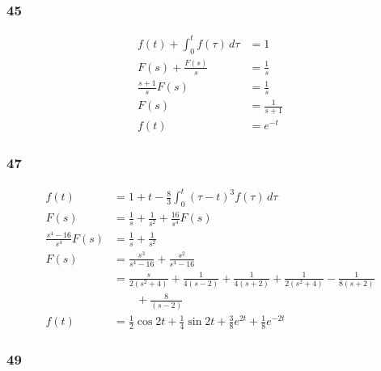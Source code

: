 \documentclass{article}
\begin{document}
\subsubsection{45}

\begin{align*}
  f(t) + \int_0^t f(\tau) \,d\tau & = 1               \\
  F(s) + \frac{F(s)}{s}           & = \frac{1}{s}     \\
  \frac{s + 1}{s} F(s)            & = \frac{1}{s}     \\
  F(s)                            & = \frac{1}{s + 1} \\
  f(t)                            & = e^{-t}
\end{align*}

\subsubsection{47}

\begin{align*}
  f(t)                      & = 1 + t - \frac{8}{3} \int_0^t (\tau - t)^3 f(\tau) \,d\tau                                                       \\
  F(s)                      & = \frac{1}{s} + \frac{1}{s^2} + \frac{16}{s^4} F(s)                                                               \\
  \frac{s^4 - 16}{s^4} F(s) & = \frac{1}{s} + \frac{1}{s^2}                                                                                     \\
  F(s)                      & = \frac{s^3}{s^4 - 16} + \frac{s^2}{s^4 - 16}                                                                     \\
                            & = \frac{s}{2 (s^2 + 4)} + \frac{1}{4 (s - 2)} + \frac{1}{4 (s + 2)} + \frac{1}{2 (s^2 + 4)} - \frac{1}{8 (s + 2)} \\
                            & \qquad + \frac{8}{(s - 2)}                                                                                        \\
  f(t)                      & = \frac{1}{2} \cos 2 t + \frac{1}{4} \sin 2 t + \frac{3}{8} e^{2 t} + \frac{1}{8} e^{-2 t}
\end{align*}

\subsubsection{49}
\end{document}
